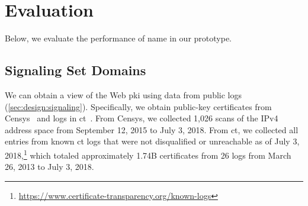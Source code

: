 \section{Evaluation}
\label{sec:evaluation}

Below, we evaluate the performance of \ac{name} in our prototype.

\subsection{Signaling Set Domains}
\label{sec:evaluation:https}


We can obtain a view of the Web \ac{pki} using data from public logs (\autoref{sec:design:signaling}). 
Specifically, we obtain public-key
certificates from Censys~\cite{durumeric2015search} and logs in
\ac{ct}~\cite{rfc6962}. From Censys, we collected 1,026 scans of the IPv4
address space from September 12, 2015 to July 3, 2018.
From \ac{ct}, we collected all entries from known \ac{ct} logs that were not
disqualified or unreachable as of July 3,
2018,\footnote{\url{https://www.certificate-transparency.org/known-logs}} which
totaled approximately 1.74B certificates from 26 logs from
March 26, 2013 to July 3, 2018.


